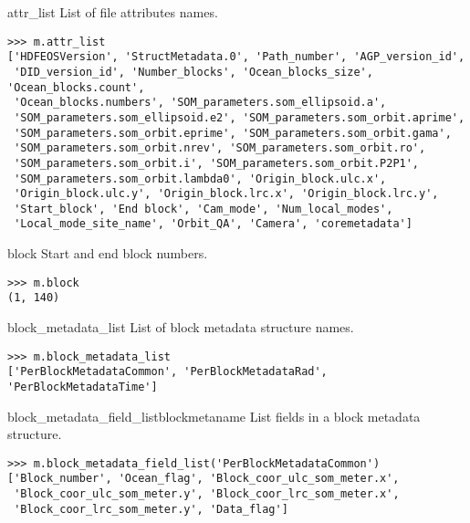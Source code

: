 \documentclass{howto}
\begin{document}
\begin{memberdesc}[list]{attr_list}
  List of file attributes names.

\begin{verbatim}
>>> m.attr_list
['HDFEOSVersion', 'StructMetadata.0', 'Path_number', 'AGP_version_id',
 'DID_version_id', 'Number_blocks', 'Ocean_blocks_size', 'Ocean_blocks.count',
 'Ocean_blocks.numbers', 'SOM_parameters.som_ellipsoid.a',
 'SOM_parameters.som_ellipsoid.e2', 'SOM_parameters.som_orbit.aprime',
 'SOM_parameters.som_orbit.eprime', 'SOM_parameters.som_orbit.gama',
 'SOM_parameters.som_orbit.nrev', 'SOM_parameters.som_orbit.ro',
 'SOM_parameters.som_orbit.i', 'SOM_parameters.som_orbit.P2P1',
 'SOM_parameters.som_orbit.lambda0', 'Origin_block.ulc.x',
 'Origin_block.ulc.y', 'Origin_block.lrc.x', 'Origin_block.lrc.y',
 'Start_block', 'End block', 'Cam_mode', 'Num_local_modes',
 'Local_mode_site_name', 'Orbit_QA', 'Camera', 'coremetadata']
\end{verbatim}
\end{memberdesc}

\begin{memberdesc}[tuple]{block}
  Start and end block numbers.

\begin{verbatim}
>>> m.block
(1, 140)
\end{verbatim}
\end{memberdesc}

\begin{memberdesc}[list]{block_metadata_list}
  List of block metadata structure names.

\begin{verbatim}
>>> m.block_metadata_list
['PerBlockMetadataCommon', 'PerBlockMetadataRad', 'PerBlockMetadataTime']
\end{verbatim}
\end{memberdesc}

\begin{methoddesc}{block_metadata_field_list}{blockmetaname}
  List fields in a block metadata structure.

\begin{verbatim}
>>> m.block_metadata_field_list('PerBlockMetadataCommon')
['Block_number', 'Ocean_flag', 'Block_coor_ulc_som_meter.x',
 'Block_coor_ulc_som_meter.y', 'Block_coor_lrc_som_meter.x',
 'Block_coor_lrc_som_meter.y', 'Data_flag']
\end{verbatim}
\end{methoddesc}
 
\end{document}

